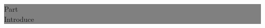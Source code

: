 \documentclass[oneside,A4paper,12pt]{article}
\begin{document}
\begin{titlepage} %
	
	
	\colorbox{grey}{
		\parbox[t]{0.93\textwidth}{ %
			\parbox[t]{0.91\textwidth}{ %
				\raggedleft %
				\fontsize{50pt}{80pt}\selectfont %
				\vspace{0.7cm} %
				
				Part \uppercase\expandafter{}\\
				Introduce\\
				
				\vspace{0.7cm} %
			}
		}
	}
	
	\vfill %
	
	
	
\end{titlepage}
\end{document}
